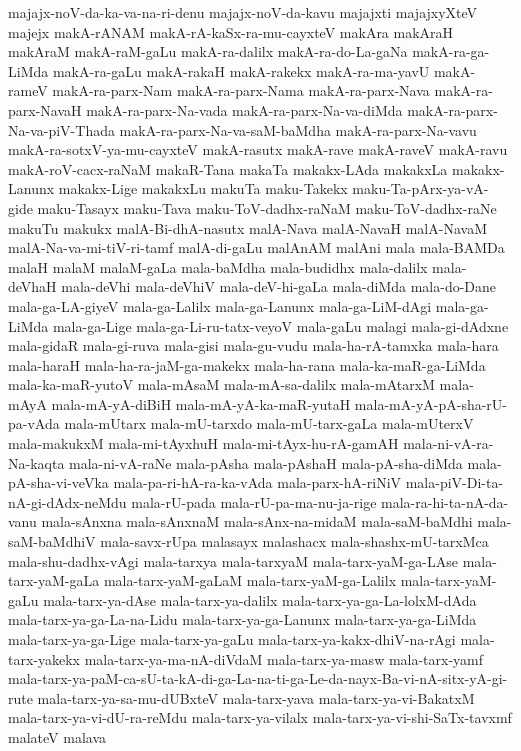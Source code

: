{majajx-noV-da-ka-va-na-ri-denu
majajx-noV-da-kavu
majajxti
majajxyXteV
majejx
makA-rANAM
makA-rA-kaSx-ra-mu-cayxteV
makAra
makAraH
makAraM
makA-raM-gaLu
makA-ra-dalilx
makA-ra-do-La-gaNa
makA-ra-ga-LiMda
makA-ra-gaLu
makA-rakaH
makA-rakekx
makA-ra-ma-yavU
makA-rameV
makA-ra-parx-Nam
makA-ra-parx-Nama
makA-ra-parx-Nava
makA-ra-parx-NavaH
makA-ra-parx-Na-vada
makA-ra-parx-Na-va-diMda
makA-ra-parx-Na-va-piV-Thada
makA-ra-parx-Na-va-saM-baMdha
makA-ra-parx-Na-vavu
makA-ra-sotxV-ya-mu-cayxteV
makA-rasutx
makA-rave
makA-raveV
makA-ravu
makA-roV-cacx-raNaM
makaR-Tana
makaTa
makakx-LAda
makakxLa
makakx-Lanunx
makakx-Lige
makakxLu
makuTa
maku-Takekx
maku-Ta-pArx-ya-vA-gide
maku-Tasayx
maku-Tava
maku-ToV-dadhx-raNaM
maku-ToV-dadhx-raNe
makuTu
makukx
malA-Bi-dhA-nasutx
malA-Nava
malA-NavaH
malA-NavaM
malA-Na-va-mi-tiV-ri-tamf
malA-di-gaLu
malAnAM
malAni
mala
mala-BAMDa
malaH
malaM
malaM-gaLa
mala-baMdha
mala-budidhx
mala-dalilx
mala-deVhaH
mala-deVhi
mala-deVhiV
mala-deV-hi-gaLa
mala-diMda
mala-do-Dane
mala-ga-LA-giyeV
mala-ga-Lalilx
mala-ga-Lanunx
mala-ga-LiM-dAgi
mala-ga-LiMda
mala-ga-Lige
mala-ga-Li-ru-tatx-veyoV
mala-gaLu
malagi
mala-gi-dAdxne
mala-gidaR
mala-gi-ruva
mala-gisi
mala-gu-vudu
mala-ha-rA-tamxka
mala-hara
mala-haraH
mala-ha-ra-jaM-ga-makekx
mala-ha-rana
mala-ka-maR-ga-LiMda
mala-ka-maR-yutoV
mala-mAsaM
mala-mA-sa-dalilx
mala-mAtarxM
mala-mAyA
mala-mA-yA-diBiH
mala-mA-yA-ka-maR-yutaH
mala-mA-yA-pA-sha-rU-pa-vAda
mala-mUtarx
mala-mU-tarxdo
mala-mU-tarx-gaLa
mala-mUterxV
mala-makukxM
mala-mi-tAyxhuH
mala-mi-tAyx-hu-rA-gamAH
mala-ni-vA-ra-Na-kaqta
mala-ni-vA-raNe
mala-pAsha
mala-pAshaH
mala-pA-sha-diMda
mala-pA-sha-vi-veVka
mala-pa-ri-hA-ra-ka-vAda
mala-parx-hA-riNiV
mala-piV-Di-ta-nA-gi-dAdx-neMdu
mala-rU-pada
mala-rU-pa-ma-nu-ja-rige
mala-ra-hi-ta-nA-da-vanu
mala-sAnxna
mala-sAnxnaM
mala-sAnx-na-midaM
mala-saM-baMdhi
mala-saM-baMdhiV
mala-savx-rUpa
malasayx
malashacx
mala-shashx-mU-tarxMca
mala-shu-dadhx-vAgi
mala-tarxya
mala-tarxyaM
mala-tarx-yaM-ga-LAse
mala-tarx-yaM-gaLa
mala-tarx-yaM-gaLaM
mala-tarx-yaM-ga-Lalilx
mala-tarx-yaM-gaLu
mala-tarx-ya-dAse
mala-tarx-ya-dalilx
mala-tarx-ya-ga-La-lolxM-dAda
mala-tarx-ya-ga-La-na-Lidu
mala-tarx-ya-ga-Lanunx
mala-tarx-ya-ga-LiMda
mala-tarx-ya-ga-Lige
mala-tarx-ya-gaLu
mala-tarx-ya-kakx-dhiV-na-rAgi
mala-tarx-yakekx
mala-tarx-ya-ma-nA-diVdaM
mala-tarx-ya-masw
mala-tarx-yamf
mala-tarx-ya-paM-ca-sU-ta-kA-di-ga-La-na-ti-ga-Le-da-nayx-Ba-vi-nA-sitx-yA-gi-rute
mala-tarx-ya-sa-mu-dUBxteV
mala-tarx-yava
mala-tarx-ya-vi-BakatxM
mala-tarx-ya-vi-dU-ra-reMdu
mala-tarx-ya-vilalx
mala-tarx-ya-vi-shi-SaTx-tavxmf
malateV
malava
}
